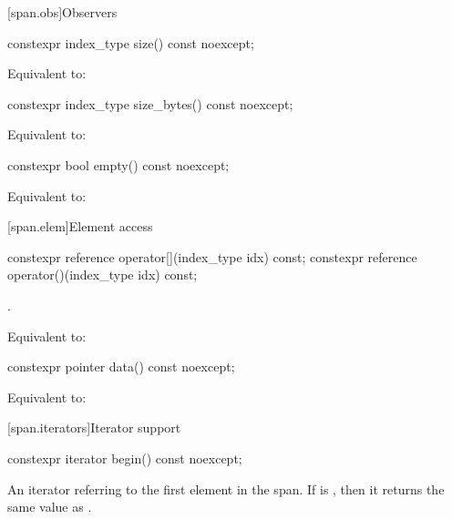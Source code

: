 \begin{codeblock}
\begin{codeblock}
\begin{codeblock}
[span.obs]{Observers}

%
\begin{itemdecl}
constexpr index_type size() const noexcept;
\end{itemdecl}
\begin{itemdescr}
\pnum
\effects
Equivalent to: 
\end{itemdescr}

%
\begin{itemdecl}
constexpr index_type size_bytes() const noexcept;
\end{itemdecl}
\begin{itemdescr}
\pnum
\effects
Equivalent to: 
\end{itemdescr}

%
\begin{itemdecl}
constexpr bool empty() const noexcept;
\end{itemdecl}
\begin{itemdescr}
\pnum
\effects
Equivalent to: 
\end{itemdescr}

[span.elem]{Element access}

%
%
\begin{itemdecl}
constexpr reference operator[](index_type idx) const;
constexpr reference operator()(index_type idx) const;
\end{itemdecl}
\begin{itemdescr}
\pnum
\requires
{}.

\pnum
\effects
Equivalent to: 
\end{itemdescr}

%
\begin{itemdecl}
constexpr pointer data() const noexcept;
\end{itemdecl}
\begin{itemdescr}
\pnum
\effects
Equivalent to: 
\end{itemdescr}

[span.iterators]{Iterator support}

%
\begin{itemdecl}
constexpr iterator begin() const noexcept;
\end{itemdecl}
\begin{itemdescr}
\pnum
\returns
An iterator referring to the first element in the span.
If  is , then it returns the
same value as .
\end{itemdescr}


\end{codeblock}
\end{codeblock}
\end{codeblock}
